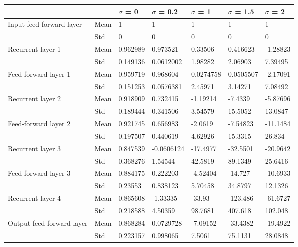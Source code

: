 \begin{tabular}{lllllll}
\toprule
                          &     & $\sigma$  = 0 & $\sigma$  = 0.2 & $\sigma$  = 1 & $\sigma$  = 1.5 & $\sigma$  = 2 \\
\midrule
Input feed-forward layer & Mean &             1 &               1 &             1 &               1 &             1 \\
                          & Std &             0 &               0 &             0 &               0 &             0 \\
Recurrent layer 1 & Mean &      0.962989 &        0.973521 &       0.33506 &        0.416623 &      -1.28823 \\
                          & Std &      0.149136 &       0.0612002 &       1.98282 &         2.06903 &       7.39495 \\
Feed-forward layer 1 & Mean &      0.959719 &        0.968604 &     0.0274758 &       0.0505507 &      -2.17091 \\
                          & Std &      0.151253 &       0.0576381 &       2.45971 &         3.14271 &       7.08492 \\
Recurrent layer 2 & Mean &      0.918909 &        0.732415 &      -1.19214 &         -7.4339 &      -5.87696 \\
                          & Std &      0.189444 &        0.341506 &       3.54579 &         15.5052 &       13.0847 \\
Feed-forward layer 2 & Mean &      0.921745 &        0.656983 &       -2.0619 &        -7.54823 &      -11.1484 \\
                          & Std &      0.197507 &        0.440619 &       4.62926 &         15.3315 &        26.834 \\
Recurrent layer 3 & Mean &      0.847539 &      -0.0606124 &      -17.4977 &        -32.5501 &      -20.9642 \\
                          & Std &      0.368276 &         1.54544 &       42.5819 &         89.1349 &       25.6416 \\
Feed-forward layer 3 & Mean &      0.884175 &        0.222203 &      -4.52404 &         -14.727 &      -10.6933 \\
                          & Std &       0.23553 &        0.838123 &       5.70458 &         34.8797 &       12.1326 \\
Recurrent layer 4 & Mean &      0.865608 &        -1.33335 &        -33.93 &        -123.486 &      -61.6727 \\
                          & Std &      0.218588 &         4.50359 &       98.7681 &         407.618 &       102.048 \\
Output feed-forward layer & Mean &      0.868284 &       0.0729728 &      -7.09152 &        -33.4382 &      -19.4922 \\
                          & Std &      0.223157 &        0.998065 &        7.5061 &         75.1131 &       28.0848 \\
\bottomrule
\end{tabular}
